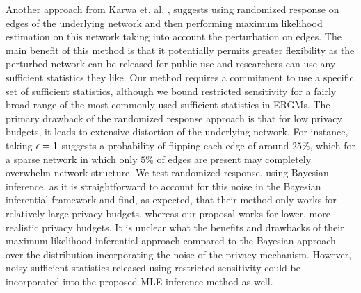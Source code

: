 Another approach from Karwa et. al. \cite{KKS17}, suggests using randomized response on edges of the underlying network and then performing maximum likelihood estimation on this network taking into account the perturbation on edges. The main benefit of this method is that it potentially permits greater flexibility as the perturbed network can be released for public use and researchers can use any sufficient statistics they like. Our method requires a commitment to use a specific set of sufficient statistics, although we bound restricted sensitivity for a fairly broad range of the most commonly used sufficient statistics in ERGMs. The primary drawback of the randomized response approach is that for low privacy budgets, it leads to extensive distortion of the underlying network. For instance, taking $\epsilon =1$ suggests a probability of flipping each edge of around $25\%$, which for a sparse network in which only $5\%$ of edges are present may completely overwhelm network structure. We test randomized response, using Bayesian inference, as it is straightforward to account for this noise in the Bayesian inferential framework and find, as expected, that their method only works for relatively large privacy budgets, whereas our proposal works for lower, more realistic privacy budgets. It is unclear what the benefits and drawbacks of their maximum likelihood inferential approach compared to the Bayesian approach over the distribution incorporating the noise of the privacy mechanism. However, noisy sufficient statistics released using restricted sensitivity could be incorporated into the proposed MLE inference method as well.




